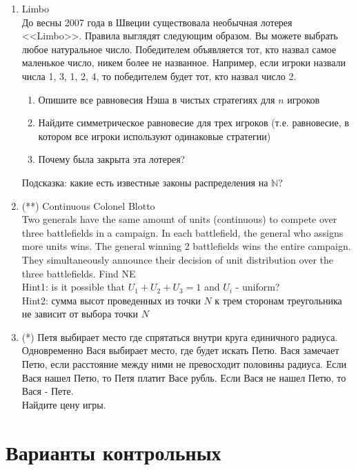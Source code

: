 \documentclass[pdftex,12pt,a4paper]{article}
\begin{document}
\begin{enumerate}
\item Limbo \\
До весны 2007 года в Швеции существовала необычная лотерея <<Limbo>>. Правила выглядят следующим образом. Вы можете выбрать любое натуральное число. Победителем объявляется тот, кто назвал самое маленькое число, никем более не названное. Например, если игроки назвали числа 1, 3, 1, 2, 4, то победителем будет тот, кто назвал число 2. 
\begin{enumerate}
\item Опишите все равновесия Нэша в чистых стратегиях для $n$ игроков 
\item Найдите симметрическое равновесие для трех игроков (т.е. равновесие, в котором все игроки используют одинаковые стратегии) 
\item Почему была закрыта эта лотерея? 
\end{enumerate}
Подсказка: какие есть известные законы распределения на $\mathbb{N}$? 

\item (**) Continuous Colonel Blotto \\
Two generals have the same amount of units (continuous) to compete over three battlefields in a campaign. In each battlefield, the general who assigns more units wins. The general winning 2 battlefields wins the entire campaign. They simultaneously announce their decision of unit distribution over the three battlefields. Find NE \\
Hint1: is it possible that $U_{1}+U_{2}+U_{3}=1$ and $U_{i}$ - uniform? \\
Hint2: сумма высот проведенных из точки $N$ к трем сторонам треугольника не зависит от выбора точки $N$ 

\item (*) Петя выбирает место где спрятаться внутри круга единичного радиуса. Одновременно Вася выбирает место, где будет искать Петю. Вася замечает Петю, если расстояние между ними не превосходит половины радиуса. Если Вася нашел Петю, то Петя платит Васе рубль. Если Вася не нашел Петю, то Вася - Пете. \\
Найдите цену игры. 

\end{enumerate}

\section{Варианты контрольных} 
\end{document}
